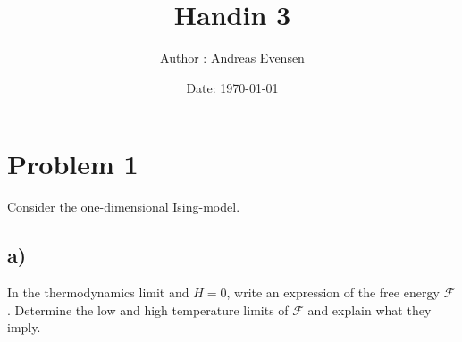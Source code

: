 \documentclass[a4paper]{article}
\title{Handin 3}
\author{Author : Andreas Evensen}
\date{Date: \today}
\begin{document}
\maketitle


\section*{Problem 1}
Consider the one-dimensional Ising-model.

\subsection*{a)}
In the thermodynamics limit and $H = 0$, write an expression of the free energy $\mathcal{F}$. Determine the low and high temperature limits of $\mathcal{F}$ and explain what they imply.
\end{document}
